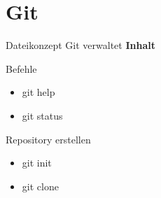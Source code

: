 \documentclass[presentation]{beamer}
\begin{document}
\section{Git}
\begin{frame}{Dateikonzept}
  Git verwaltet \textbf{Inhalt}
  \begin{figure}
    \centering
  \end{figure}
\end{frame}
\begin{frame}{Befehle}
  \begin{itemize}[<+- | alert@+>]
  \item \Huge git help
  \item \Huge git status
  \end{itemize}
\end{frame}
\begin{frame}{Repository erstellen}
  \begin{itemize}[<+-| alert@+>]
  \item git init
  \item git clone
  \end{itemize}
\end{frame}
\end{document}
